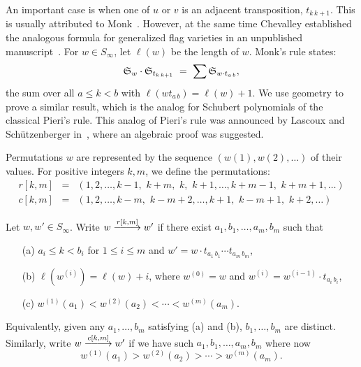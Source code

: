 An important case is when one of
$u$ or $v$ is an adjacent 
transposition, $t_{k\,k{+}1}$.
This is usually attributed to Monk~\cite{Monk}.
However,  at the same time
Chevalley established the analogous formula for generalized
flag varieties in an unpublished manuscript~\cite{Chevalley58}.   
For $w\in S_{\infty}$,
let $\ell(w)$ be the length of $w$.   
Monk's rule states:
\begin{equation}\label{eq:Monk}
{\frak S}_{w}\cdot {\frak S}_{t_{k\,k{+}1}}
\ =\  \sum {\frak S}_{w\cdot t_{a\,b}},
\end{equation}
the sum over all $a\leq k <b$ with 
$\ell(w t_{a\,b})=\ell(w)+1$.
We use geometry to prove a similar result, which is the analog for
Schubert polynomials of the classical 
Pieri's rule.
This analog of Pieri's rule was announced by Lascoux and Sch\"utzenberger
in~\cite{Lascoux_Schutzenberger_polynomes_schubert}, where an algebraic 
proof was suggested.
\smallskip

Permutations $w$ are represented by the sequence 
$(w(1),w(2),\ldots)$ of their values.
For positive integers $k,m$, we define the permutations:
\begin{eqnarray*}
r[k,m] &=&
(1,2,\ldots,k{-}1,\,\,k{+}m,\,\,k,\,\,k{+}1,\ldots,k{+}m{-}1,
\,\,k{+}m{+}1,\ldots)\\
c[k,m] &=&
(1,2,\ldots,k{-}m,\,\,k{-}m{+}2,\ldots,k{+}1,\,\,k{-}m{+}1,\,\,k{+}2,\ldots)
\end{eqnarray*}

Let $w,w' \in S_{\infty}$.
Write $w \rkm w'$ if
there exist $a_1,b_1,\ldots,a_m,b_m$ such that
\begin{enumerate}
\item[(a)] $a_i\leq k <b_i$ for $1\leq i\leq m$ and
$w' = w\cdot t_{a_1\,b_1}\cdots t_{a_m\,b_m}$,
 \smallskip
\item[(b)]  $\ell(w^{(i)}) = \ell(w) +i$,
where $w^{(0)} = w$ and 
$w^{(i)}=w^{(i-1)}\cdot t_{a_i\,b_i}$,
 \smallskip
\item[(c)] $w^{(1)}(a_1) <w^{(2)}(a_2)<\cdots <
w^{(m)}(a_m)$.
\end{enumerate}
Equivalently, given any $a_1,\ldots,b_m$ satisfying (a) and (b), 
$b_1,\ldots,b_m$ are distinct.
Similarly, write $w\ckm w'$ 
if we have such $a_1,b_1,\ldots,a_m,b_m$ where now
$$
w^{(1)}(a_1) >w^{(2)}(a_2)>\cdots >
w^{(m)}(a_m).
$$

